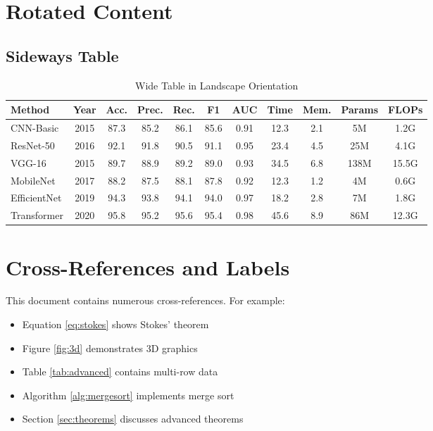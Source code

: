 \documentclass[11pt,a4paper]{article}
\theoremstyle{definition}
\begin{document}
\section{Rotated Content}

\subsection{Sideways Table}

\begin{sidewaystable}
\centering
\caption{Wide Table in Landscape Orientation}
\label{tab:sideways}
\begin{tabular}{lcccccccccc}
\toprule
\textbf{Method} & \textbf{Year} & \textbf{Acc.} & \textbf{Prec.} & \textbf{Rec.} & \textbf{F1} & \textbf{AUC} & \textbf{Time} & \textbf{Mem.} & \textbf{Params} & \textbf{FLOPs} \\
\midrule
CNN-Basic & 2015 & 87.3 & 85.2 & 86.1 & 85.6 & 0.91 & 12.3 & 2.1 & 5M & 1.2G \\
ResNet-50 & 2016 & 92.1 & 91.8 & 90.5 & 91.1 & 0.95 & 23.4 & 4.5 & 25M & 4.1G \\
VGG-16 & 2015 & 89.7 & 88.9 & 89.2 & 89.0 & 0.93 & 34.5 & 6.8 & 138M & 15.5G \\
MobileNet & 2017 & 88.2 & 87.5 & 88.1 & 87.8 & 0.92 & 12.3 & 1.2 & 4M & 0.6G \\
EfficientNet & 2019 & 94.3 & 93.8 & 94.1 & 94.0 & 0.97 & 18.2 & 2.8 & 7M & 1.8G \\
Transformer & 2020 & 95.8 & 95.2 & 95.6 & 95.4 & 0.98 & 45.6 & 8.9 & 86M & 12.3G \\
\bottomrule
\end{tabular}
\end{sidewaystable}

\section{Cross-References and Labels}

This document contains numerous cross-references. For example:
\begin{itemize}
    \item Equation \ref{eq:stokes} shows Stokes' theorem
    \item Figure \ref{fig:3d} demonstrates 3D graphics
    \item Table \ref{tab:advanced} contains multi-row data
    \item Algorithm \ref{alg:mergesort} implements merge sort
    \item Section \ref{sec:theorems} discusses advanced theorems
\end{itemize}
\end{document}
